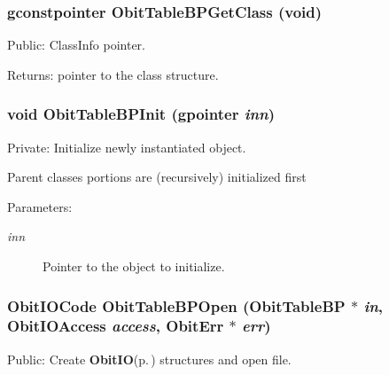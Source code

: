 \subsubsection{\setlength{\rightskip}{0pt plus 5cm}gconstpointer Obit\-Table\-BPGet\-Class (void)}\label{ObitTableBP_8c_a17}


Public: Class\-Info pointer. 

\begin{Desc}
\item[Returns:]pointer to the class structure. \end{Desc}
\subsubsection{\setlength{\rightskip}{0pt plus 5cm}void Obit\-Table\-BPInit (gpointer {\em inn})}\label{ObitTableBP_8c_a8}


Private: Initialize newly instantiated object. 

Parent classes portions are (recursively) initialized first \begin{Desc}
\item[Parameters:]
\begin{description}
\item[{\em inn}]Pointer to the object to initialize. \end{description}
\end{Desc}
\subsubsection{\setlength{\rightskip}{0pt plus 5cm}Obit\-IOCode Obit\-Table\-BPOpen ({\bf Obit\-Table\-BP} $\ast$ {\em in}, Obit\-IOAccess {\em access}, {\bf Obit\-Err} $\ast$ {\em err})}\label{ObitTableBP_8c_a21}


Public: Create {\bf Obit\-IO}{\rm (p.\,\pageref{structObitIO})} structures and open file. 

